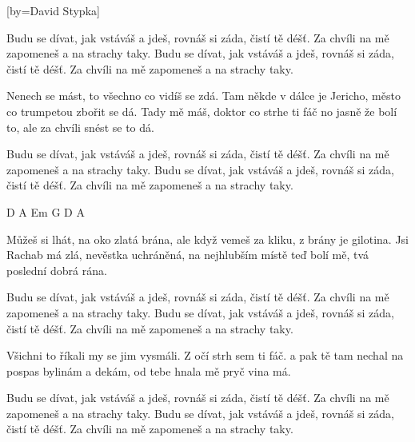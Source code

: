 [by={David Stypka}]

\beginchorus{}
Budu se dívat, jak vstáváš a jdeš,
rovnáš si záda, čistí tě déšť.
Za chvíli na mě zapomeneš a na strachy taky.
Budu se dívat, jak vstáváš a jdeš,
rovnáš si záda, čistí tě déšť.
Za chvíli na mě zapomeneš a na strachy taky.
\endchorus{}

\beginverse{}
Nenech se mást, to všechno co vidíš se zdá.
Tam někde v dálce je Jericho, město co trumpetou zbořit se dá.
Tady mě máš, doktor co strhe ti fáč
no jasně že bolí to, ale za chvíli snést se to dá.
\endverse{}

\repeatingchorus{}
\beginchorus{}
Budu se dívat, jak vstáváš a jdeš,
rovnáš si záda, čistí tě déšť.
Za chvíli na mě zapomeneš a na strachy taky.
Budu se dívat, jak vstáváš a jdeš,
rovnáš si záda, čistí tě déšť.
Za chvíli na mě zapomeneš a na strachy taky.
\endchorus{}

\beginverse*{}
D A Em G D A
\endverse{}

\beginverse{}
Můžeš si lhát, na oko zlatá brána,
ale když vemeš za kliku, z brány je gilotina.
Jsi Rachab má zlá, nevěstka uchráněná,
na nejhlubším místě teď bolí mě, tvá poslední dobrá rána.
\endverse{}

\repeatingchorus{}
\beginchorus{}
Budu se dívat, jak vstáváš a jdeš,
rovnáš si záda, čistí tě déšť.
Za chvíli na mě zapomeneš a na strachy taky.
Budu se dívat, jak vstáváš a jdeš,
rovnáš si záda, čistí tě déšť.
Za chvíli na mě zapomeneš a na strachy taky.
\endchorus{}

\beginverse{}
Všichni to říkali my se jim vysmáli.
Z očí strh sem ti fáč.
a pak tě tam nechal na pospas bylinám a dekám,
od tebe hnala mě pryč vina má.
\endverse{}

\repeatingchorus{}
\beginchorus{}
Budu se dívat, jak vstáváš a jdeš,
rovnáš si záda, čistí tě déšť.
Za chvíli na mě zapomeneš a na strachy taky.
Budu se dívat, jak vstáváš a jdeš,
rovnáš si záda, čistí tě déšť.
Za chvíli na mě zapomeneš a na strachy taky.
\endchorus{}

\endsong{}
